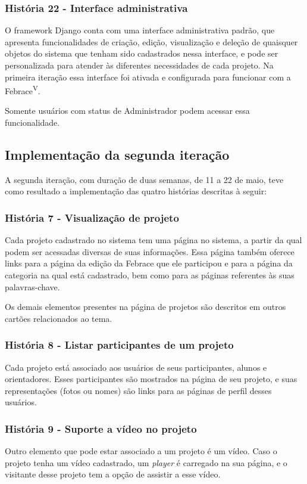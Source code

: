     \subsubsection{História 22 - Interface administrativa}
      O framework Django conta com uma interface administrativa padrão, que apresenta funcionalidades de criação, edição, visualização e deleção de quaisquer objetos do sistema que tenham sido cadastrados nessa interface, e pode ser personalizada para atender às diferentes necessidades de cada projeto. Na primeira iteração essa interface foi ativada e configurada para funcionar com a Febrace\textsuperscript{V}.

      Somente usuários com status de Administrador podem acessar essa funcionalidade.

  \subsection{Implementação da segunda iteração}
    A segunda iteração, com duração de duas semanas, de 11 a 22 de maio, teve como resultado a implementação das quatro histórias descritas à seguir:

    \subsubsection{História 7 - Visualização de projeto}
      Cada projeto cadastrado no sistema tem uma página no sistema, a partir da qual podem ser acessadas diversas de suas informações. Essa página também oferece links para a página da edição da Febrace que ele participou e para a página da categoria na qual está cadastrado, bem como para as páginas referentes às suas palavras-chave.

      Os demais elementos presentes na página de projetos são descritos em outros cartões relacionados ao tema.

    \subsubsection{História 8 - Listar participantes de um projeto}
      Cada projeto está associado aos usuários de seus participantes, alunos e orientadores. Esses participantes são mostrados na página de seu projeto, e suas representações (fotos ou nomes) são links para as páginas de perfil desses usuários.

    \subsubsection{História 9 - Suporte a vídeo no projeto}
      Outro elemento que pode estar associado a um projeto é um vídeo. Caso o projeto tenha um vídeo cadastrado, um \textit{player} é carregado na sua página, e o visitante desse projeto tem a opção de assistir a esse vídeo.

